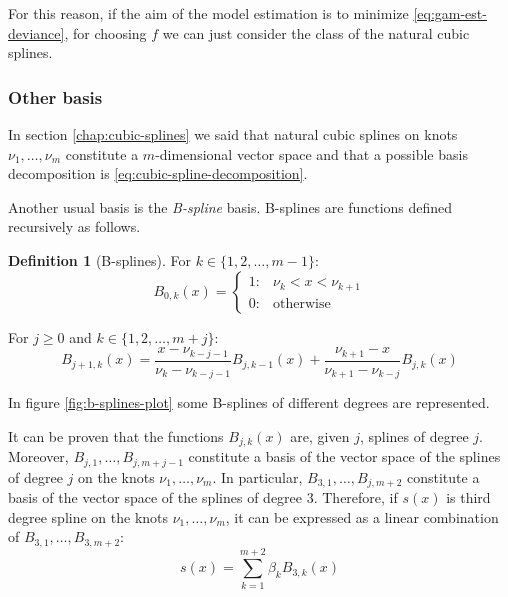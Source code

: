 \documentclass[a4paper, twoside, openright, 12pt]{report}
\let\origfigure\figure
\let\endorigfigure\endfigure
\renewenvironment{figure}[1][2] {
  \expandafter\origfigure\expandafter[!hbtp]
} {
  \endorigfigure
}
\theoremstyle{definition}
\newtheorem{definition}{Definition}[chapter]
\theoremstyle{definition}
\theoremstyle{definition}
\theoremstyle{remark}
\begin{document}
For this reason, if the aim of the model estimation is to minimize \eqref{eq:gam-est-deviance}, for choosing \(f\) we can just consider the class of the natural cubic splines.

\hypertarget{other-basis}{%
\subsubsection{Other basis}\label{other-basis}}

In section \ref{chap:cubic-splines} we said that natural cubic splines on knots \(\nu_1, \dots, \nu_m\) constitute a \(m\)-dimensional vector space and that a possible basis decomposition is \eqref{eq:cubic-spline-decomposition}.

Another usual basis is the \emph{B-spline} basis. B-splines are functions defined recursively as follows.

\begin{definition}[B-splines]
\label{def:b-splines} \iffalse (B-splines) \fi{} For \(k\in\{1,2,\dots,m-1\}\):
\[
B_{0,k}(x) = 
\begin{cases}
1: & \nu_k < x < \nu_{k+1} \\
0: & \text{otherwise}
\end{cases}
\]

For \(j \ge 0\) and \(k\in\{1,2,\dots,m+j\}\):
\[
B_{j+1,k}(x) = 
\frac{x-\nu_{k-j-1}}{\nu_{k}-\nu_{k-j-1}} B_{j,k-1}(x)
+ \frac{\nu_{k+1}-x}{\nu_{k+1}-\nu_{k-j}} B_{j,k}(x)
\]
\end{definition}

In figure \ref{fig:b-splines-plot} some B-splines of different degrees are represented.





\begin{figure}[!hbtp]

{\centering {}

}

\caption{B-splines with different degrees.}\label{fig:b-splines-plot}
\end{figure}

It can be proven that the functions \(B_{j,k}(x)\) are, given \(j\), splines of degree \(j\). Moreover, \(B_{j,1}, \dots, B_{j,m+j-1}\) constitute a basis of the vector space of the splines of degree \(j\) on the knots \(\nu_1, \dots, \nu_m\). In particular, \(B_{3,1}, \dots, B_{j,m+2}\) constitute a basis of the vector space of the splines of degree \(3\). Therefore, if \(s(x)\) is third degree spline on the knots \(\nu_1, \dots, \nu_m\), it can be expressed as a linear combination of \(B_{3,1}, \dots, B_{3,m+2}\):
\[
s(x) = \sum_{k=1}^{m+2}{\beta_{k}B_{3,k}(x)}
\]
\end{document}
